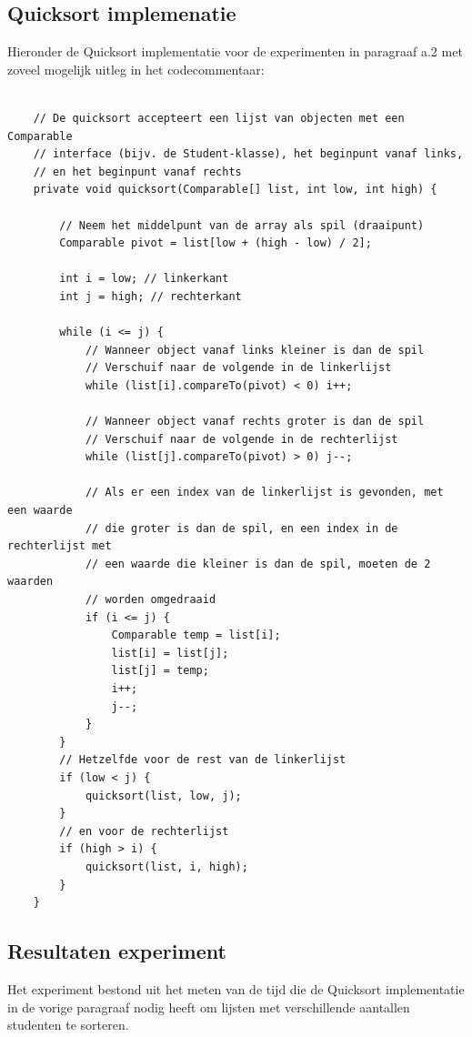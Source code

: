 \documentclass[12pt,notitlepage]{article}
\begin{document}
\subsection{Quicksort implemenatie}
Hieronder de Quicksort implementatie voor de experimenten in paragraaf a.2 met zoveel mogelijk uitleg in het codecommentaar:
\begin{lstlisting}

    // De quicksort accepteert een lijst van objecten met een Comparable
    // interface (bijv. de Student-klasse), het beginpunt vanaf links,
    // en het beginpunt vanaf rechts 
    private void quicksort(Comparable[] list, int low, int high) {

        // Neem het middelpunt van de array als spil (draaipunt)
        Comparable pivot = list[low + (high - low) / 2];

        int i = low; // linkerkant
        int j = high; // rechterkant

        while (i <= j) {
            // Wanneer object vanaf links kleiner is dan de spil
            // Verschuif naar de volgende in de linkerlijst
            while (list[i].compareTo(pivot) < 0) i++;

            // Wanneer object vanaf rechts groter is dan de spil
            // Verschuif naar de volgende in de rechterlijst
            while (list[j].compareTo(pivot) > 0) j--;

            // Als er een index van de linkerlijst is gevonden, met een waarde
            // die groter is dan de spil, en een index in de rechterlijst met
            // een waarde die kleiner is dan de spil, moeten de 2 waarden
            // worden omgedraaid
            if (i <= j) {
                Comparable temp = list[i];
                list[i] = list[j];
                list[j] = temp;
                i++;
                j--;
            }
        }
        // Hetzelfde voor de rest van de linkerlijst
        if (low < j) {
            quicksort(list, low, j);
        }
        // en voor de rechterlijst
        if (high > i) {
            quicksort(list, i, high);
        }
    }
\end{lstlisting}

\clearpage
\subsection{Resultaten experiment}
Het experiment bestond uit het meten van de tijd die de Quicksort implementatie in de vorige paragraaf nodig heeft om lijsten met verschillende aantallen studenten te sorteren.
\end{document}
